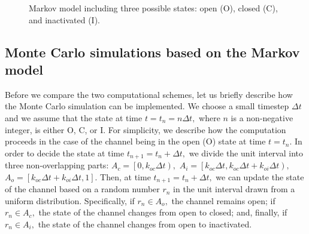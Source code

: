 \begin{figure}[ptb]
\begin{center}
\end{center}
\caption{Markov model including three possible states: open (O), closed (C), and
inactivated (I).}%
\label{IOC_me}%
\end{figure}




\subsection[Monte Carlo Simulations]{Monte Carlo simulations based on the Markov model \label{MCSMM}}

Before we compare the two computational schemes, let us briefly describe how
the Monte Carlo simulation can be implemented. We choose a small timestep
$\Delta t$ and we assume that the state at time $t=t_{n}=n\Delta t,$ where $n$
is a non-negative integer, is either O, C, or I. For simplicity, we describe how
the computation proceeds in the case of the channel being in the open (O)
state at time $t=t_{n}$. In order to decide the state at time $t_{n+1}=t_{n}+\Delta t,$ we
divide the unit interval into three non-overlapping parts:  $A_{c}=\left[
0,k_{oc}\Delta t\right)  ,$ $A_{i}=\left[  k_{oc}\Delta t,k_{oc}\Delta
t+k_{oi}\Delta t\right)  ,$ $A_{o}=\left[  k_{oc}\Delta t+k_{oi}\Delta
t,1\right]  .$ Then, at time $t_{n+1}=t_{n}+\Delta t,$ we can update the state
of the channel based on a random number $r_{n}$ in the unit interval drawn from
a uniform distribution. Specifically, if $r_{n}\in A_{o},$ the channel
remains open; if $r_{n}\in A_{c},$ the state of the channel changes from
open to closed; and, finally, if $r_{n}\in A_{i},$ the state of the channel
changes from open to inactivated. 


